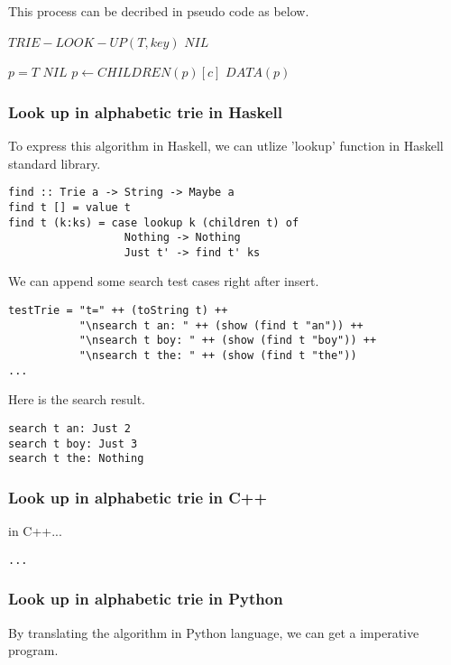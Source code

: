 \documentclass{article}
\begin{document}
This process can be decribed in pseudo code as below.

\begin{algorithmic}
\STATE $TRIE-LOOK-UP(T, key)$
   \RETURN $NIL$ \ENDIF

  \STATE $p=T$
      \RETURN $NIL$
    \ENDIF
    \STATE $p \leftarrow CHILDREN(p)[c]$
  \ENDFOR
  \RETURN $DATA(p)$
\end{algorithmic}

\subsubsection*{Look up in alphabetic trie in Haskell}
To express this algorithm in Haskell, we can utlize 'lookup' function
in Haskell standard library\cite{wiki-trie}.

\lstset{language=Haskell}
\begin{lstlisting}
find :: Trie a -> String -> Maybe a
find t [] = value t
find t (k:ks) = case lookup k (children t) of
                  Nothing -> Nothing
                  Just t' -> find t' ks
\end{lstlisting}

We can append some search test cases right after insert.

\begin{lstlisting}
testTrie = "t=" ++ (toString t) ++ 
           "\nsearch t an: " ++ (show (find t "an")) ++
           "\nsearch t boy: " ++ (show (find t "boy")) ++
           "\nsearch t the: " ++ (show (find t "the"))
...
\end{lstlisting}

Here is the search result.

\begin{verbatim}
search t an: Just 2
search t boy: Just 3
search t the: Nothing
\end{verbatim}

\subsubsection*{Look up in alphabetic trie in C++}
in C++...

\lstset{language=C++}
\begin{lstlisting}
...
\end{lstlisting}


\subsubsection*{Look up in alphabetic trie in Python}
By translating the algorithm in Python language, we can get 
a imperative program.
\end{document}
